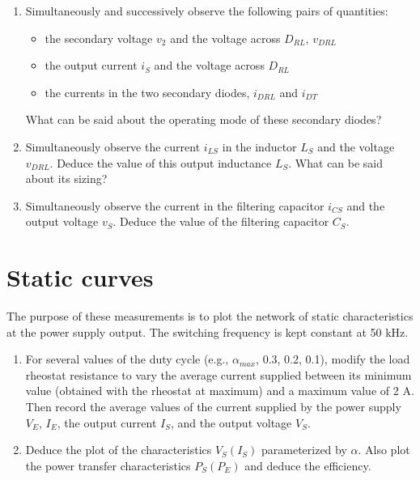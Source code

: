 \begin{enumerate}
\item Simultaneously and successively observe the following pairs of quantities:
\begin{itemize}
\item the secondary voltage $v_2$ and the voltage across $D_{RL}$, $v_{DRL}$
\item the output current $i_S$ and the voltage across $D_{RL}$
\item the currents in the two secondary diodes, $i_{DRL}$ and $i_{DT}$
\end{itemize}

What can be said about the operating mode of these secondary diodes?

\item Simultaneously observe the current $i_{LS}$ in the inductor $L_S$ and the voltage $v_{DRL}$. Deduce the value of this output inductance $L_S$. What can be said about its sizing?

\item Simultaneously observe the current in the filtering capacitor $i_{CS}$ and the output voltage $v_S$. Deduce the value of the filtering capacitor $C_S$.
\end{enumerate}

\section{Static curves}

The purpose of these measurements is to plot the network of static characteristics at the power supply output. The switching frequency is kept constant at 50 kHz.

\begin{enumerate}
\item For several values of the duty cycle (e.g., $\alpha_{max}$, 0.3, 0.2, 0.1), modify the load rheostat resistance to vary the average current supplied between its minimum value (obtained with the rheostat at maximum) and a maximum value of 2 A. Then record the average values of the current supplied by the power supply $V_E$, $I_E$, the output current $I_S$, and the output voltage $V_S$.

\item Deduce the plot of the characteristics $V_S(I_S)$ parameterized by $\alpha$. Also plot the power transfer characteristics $P_S(P_E)$ and deduce the efficiency.
\end{enumerate}